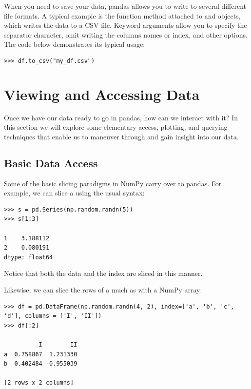 When you need to save your data, pandas allows you to write to several different file formats.
A typical example is the  function method attached to  and  objects,
which writes the data to a CSV file.
Keyword arguments allow you to specify the separator character, omit writing the columns names or index,
and other options. The code below demonstrates its typical usage:
\begin{lstlisting}
>>> df.to_csv("my_df.csv")
\end{lstlisting}

\section*{Viewing and Accessing Data}

Once we have our data ready to go in pandas, how can we interact with it?
In this section we will explore some elementary access, plotting, and querying techniques that enable us to maneuver through
and gain insight into our data.

\subsection*{Basic Data Access}
Some of the basic slicing paradigms in NumPy carry over to pandas. 
For example, we can slice a  using the usual syntax:
\begin{lstlisting}
>>> s = pd.Series(np.random.randn(5))
>>> s[1:3]

1    3.188112
2    0.080191
dtype: float64
\end{lstlisting}
Notice that both the data and the index are sliced in this manner.

Likewise, we can slice the rows of a  much as with a NumPy array:
\begin{lstlisting}
>>> df = pd.DataFrame(np.random.randn(4, 2), index=['a', 'b', 'c', 'd'], columns = ['I', 'II'])
>>> df[:2]

          I        II
a  0.758867  1.231330
b  0.402484 -0.955039

[2 rows x 2 columns]
\end{lstlisting}

